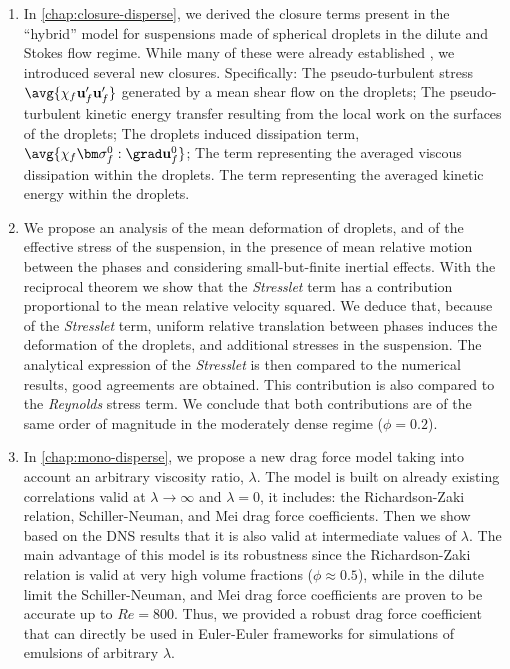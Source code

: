 \begin{enumerate}
    \item In \ref{chap:closure-disperse}, we derived the closure terms present in the ``hybrid'' model for suspensions made of spherical droplets in the dilute and Stokes flow regime. 
    While many of these were already established \citep[Appendix A]{zhang1997momentum}, we introduced several new closures.
    Specifically: 
    The pseudo-turbulent stress $\avg{\chi_f \textbf{u}_f'\textbf{u}_f'}$ generated by a mean shear flow on the droplets; 
    The pseudo-turbulent kinetic energy transfer resulting from the local work on the surfaces of the droplets; 
    The droplets induced dissipation term, $\avg{\chi_f \bm\sigma_f^0:\grad \textbf{u}_f^0}$; 
    The term representing the averaged viscous dissipation within the droplets. 
    The term representing the averaged kinetic energy within the droplets. 
    \item We propose an analysis of the mean deformation of droplets, and of the effective stress of the suspension, in the presence of mean relative motion between the phases and considering small-but-finite inertial effects. 
    With the reciprocal theorem we show that the \textit{Stresslet} term has a contribution proportional to the mean relative velocity squared. 
    We deduce that, because of the \textit{Stresslet} term, uniform relative translation between phases induces the deformation of the droplets, and additional stresses in the suspension. 
    The analytical expression of the \textit{Stresslet} is then compared to the numerical results, good agreements are obtained. 
    This contribution is also compared to the \textit{Reynolds} stress term. 
    We conclude that both contributions are of the same order of magnitude in the moderately dense regime ($\phi =0.2$). 
    \item In \ref{chap:mono-disperse}, we propose a new drag force model taking into account an arbitrary viscosity ratio, $\lambda$. 
    The model is built on already existing correlations valid at $\lambda\to\infty$ and $\lambda = 0$, it includes: the Richardson-Zaki relation, Schiller-Neuman, and Mei drag force coefficients.
    Then we show based on the DNS results that it is also valid at intermediate values of $\lambda$.
    The main advantage of this model is its robustness since the Richardson-Zaki relation is valid at very high volume fractions  ($\phi \approx 0.5$), while in the dilute limit the Schiller-Neuman, and Mei drag force coefficients are proven to be accurate up to $Re = 800$. 
    Thus, we provided a robust drag force coefficient that can directly be used in Euler-Euler frameworks for simulations of emulsions of arbitrary $\lambda$.   

\end{enumerate}
